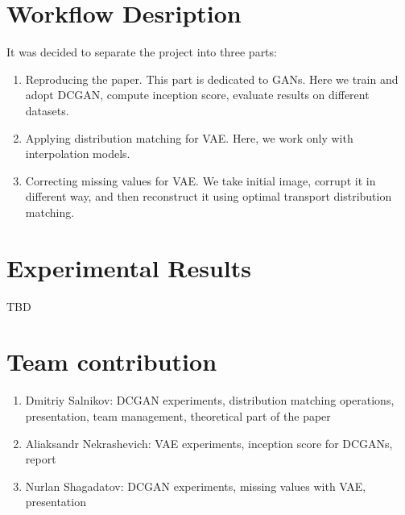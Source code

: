 \documentclass{article}
\begin{document}
\section{Workflow Desription}

It was decided to separate the project into three parts:

\begin{enumerate}
    \item Reproducing the paper. This part is dedicated to GANs. 
        Here we train and adopt DCGAN,
        compute inception score, evaluate results on 
        different datasets.

    \item Applying distribution matching for VAE. Here, we work
        only with interpolation models.

    \item Correcting missing values for VAE. We take 
        initial image, corrupt it in different way, 
        and then reconstruct 
        it using optimal transport distribution matching.
\end{enumerate}

\section{Experimental Results}

TBD

\section{Team contribution}

\begin{enumerate}
        \item Dmitriy Salnikov: DCGAN experiments,
            distribution matching operations, presentation,
            team management, theoretical part of the paper
        \item Aliaksandr Nekrashevich: VAE experiments,
            inception score for DCGANs, report
        \item Nurlan Shagadatov: DCGAN experiments,
            missing values with VAE, presentation
\end{enumerate}



\end{document}
